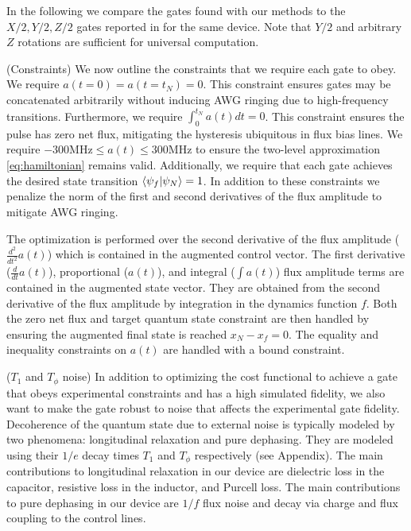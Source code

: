 \documentclass[
  amsfonts,
  amsmath,
  tbtags,
  amssymb,
  aps,
  nobibnotes,
  twocolumn,
]{revtex4-2}
\begin{document}
In the following we compare the gates found with our methods
to the $X/2, Y/2, Z/2$ gates reported in \cite{zhang2020universal}
for the same device. Note that $Y/2$ and arbitrary $Z$ rotations
are sufficient for universal computation.

(Constraints) We now outline the constraints that we require each gate
to obey.
We require $a(t = 0) = a(t = t_{N}) = 0$.
This constraint ensures gates may be concatenated arbitrarily without
inducing AWG ringing due to high-frequency transitions.
Furthermore, we require $\int_{0}^{t_{N}} a(t) dt = 0$. This
constraint ensures the pulse has zero net flux, mitigating
the hysteresis ubiquitous in flux bias lines.
We require $-300 \textrm{MHz} \le a(t) \le 300 \textrm{MHz}$
to ensure the two-level approximation \ref{eq:hamiltonian}
remains valid. Additionally, we require that each gate achieves
the desired state transition $\braket{\psi_{f} \lvert \psi_{N}} = 1$.
In addition to these constraints we penalize the norm
of the first and second derivatives of the flux amplitude
to mitigate AWG ringing.

The optimization is performed over the second derivative of the flux amplitude
($\frac{d^{2}}{dt^{2}} a(t)$) which is contained in the
augmented control vector. The first derivative
($\frac{d}{dt} a(t)$), proportional ($a(t)$), and integral ($\int a(t)$)
flux amplitude terms
are contained in the augmented state vector. They are obtained from
the second derivative of the flux amplitude by
integration in the dynamics function $f$.
Both the zero net flux and target quantum state constraint
are then handled by ensuring the augmented final state is
reached $x_{N} - x_{f} = 0$.
The equality and inequality constraints on $a(t)$ are handled
with a bound constraint.

($T_{1}$ and $T_{\phi}$ noise)
In addition to optimizing the cost functional to achieve a gate
that obeys experimental constraints and has a high simulated fidelity,
we also want to make the gate robust to noise that affects the experimental
gate fidelity. Decoherence of the quantum state due to external noise
is typically modeled by two phenomena: longitudinal relaxation and pure dephasing.
They are modeled using their $1/e$ decay times $T_{1}$ and $T_{\phi}$ respectively
(see Appendix).
The main contributions to longitudinal relaxation in our
device are dielectric loss in the capacitor, resistive loss in the inductor,
and Purcell loss. The main contributions to pure dephasing in our
device are $1/f$ flux noise and decay via charge and flux coupling
to the control lines.
\end{document}

